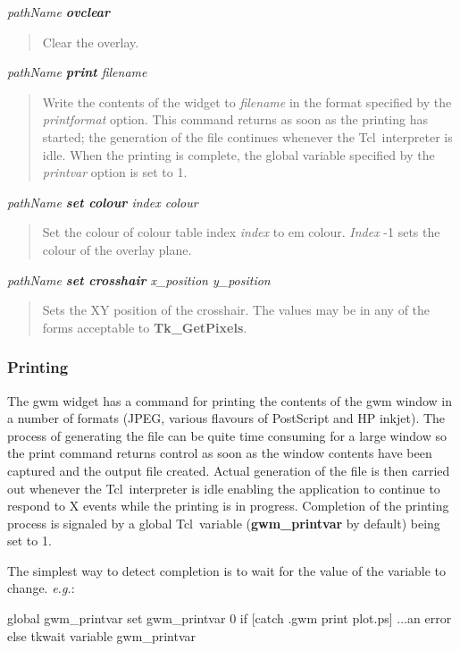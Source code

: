 \documentclass[twoside,11pt,nolof]{starlink}
\newenvironment{rquote}{\begin{quote}\raggedright}{\end{quote}}
\providecommand{\Tcl}{{\textsf{Tcl}}}
\begin{document}
\emph{pathName \textbf{ovclear}}
\begin{rquote}
Clear the overlay.
\end{rquote}

\emph{pathName \textbf{print} filename}
\begin{rquote}
Write the contents of the widget to \emph{filename} in the format specified
by the \emph{printformat} option. This command returns as soon as the printing
has started; the generation of the file continues whenever the \Tcl\ interpreter
is idle. When the printing is complete, the global variable specified by the
\emph{printvar} option is set to 1.
\end{rquote}

\emph{pathName \textbf{set colour} index colour}
\begin{rquote}
Set the colour of colour table index \emph{index} to {em colour}. \emph{Index}
-1 sets the colour of the overlay plane.
\end{rquote}

\emph{pathName \textbf{set crosshair} x\_position y\_position}
\begin{rquote}
Sets the XY position of the crosshair.
The values may be in any of the forms acceptable to \textbf{Tk\_GetPixels}.
\end{rquote}

\subsubsection{Printing}

The gwm widget has a command for printing the contents of the gwm window in
a number of formats (JPEG, various flavours of PostScript and HP inkjet).
The process of generating the file can be quite time consuming for a large
window so the print command returns control as soon as the window contents
have been captured and the output file created. Actual generation of the
file is then carried out whenever the \Tcl\ interpreter is idle enabling the
application to continue to respond to X events while the printing is in
progress.
Completion of the printing process is signaled by a global \Tcl\ variable
(\textbf{gwm\_printvar} by default) being set to 1.

The simplest way to detect completion is to wait for the value of the
variable to change. {\em{e.g.}}:

\begin{terminalv}
global gwm_printvar
set gwm_printvar 0
if [catch {.gwm print plot.ps}] {
   ...an error
} else {
   tkwait variable gwm_printvar
}
\end{terminalv}
\end{document}
